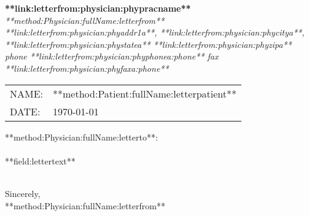 \documentclass{article}
\begin{document}
\begin{center}
	{\textbf{**link:letterfrom:physician:phypracname**}} \\
	{\textsl{**method:Physician:fullName:letterfrom**}} \\
	\textsl{**link:letterfrom:physician:phyaddr1a**, **link:letterfrom:physician:phycitya**, **link:letterfrom:physician:phystatea** **link:letterfrom:physician:phyzipa** } \\
	\textsl{phone **link:letterfrom:physician:phyphonea:phone** fax **link:letterfrom:physician:phyfaxa:phone**}
\end{center}


\begin{tabular}{ll}
	NAME:	&	**method:Patient:fullName:letterpatient**	\\
	DATE:	&	\today
\end{tabular}

**method:Physician:fullName:letterto**: \\

\hfill \\

**field:lettertext**

\hfill \\

Sincerely, \\
**method:Physician:fullName:letterfrom**
\end{document}
